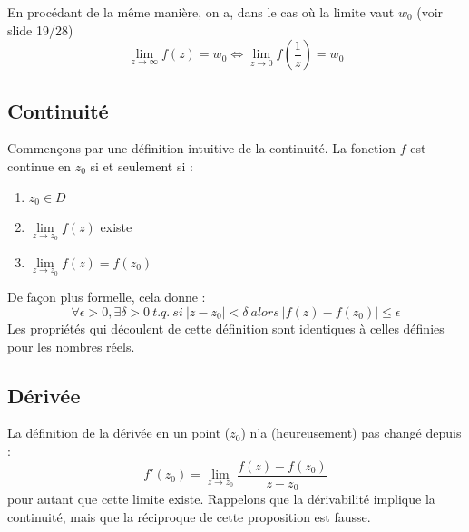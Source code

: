 En procédant de la même manière, on a, dans le cas où la limite
vaut $w_0$ (voir slide 19/28) 
\begin{equation}
	\lim \limits _{z \rightarrow \infty} f(z) = w_0 \Leftrightarrow \lim \limits _{z \rightarrow 0} f(\frac{1}{z}) = w_0 
\end{equation}

        
        
\subsection{Continuité}
Commençons par une définition intuitive de la continuité. La fonction $f$ est continue
en $z_0$ si et seulement si :
\begin{enumerate}
	\item $z_0 \in D$
	\item $\lim\limits_{z\rightarrow z_0} f(z)$ existe
	\item $\lim\limits_{z\rightarrow z_0} f(z) = f(z_0)$
\end{enumerate}
De façon plus formelle, cela donne :
\begin{equation}
	\forall \epsilon > 0, \exists \delta > 0\ t.q.\ si\ |z-z_0| < \delta\ alors\ |f(z) - f(z_0)|\leq \epsilon
\end{equation}
Les propriétés qui découlent de cette définition sont identiques à celles définies pour les
nombres réels.
    
    
\subsection{Dérivée}
La définition de la dérivée en un point ($z_0$) n'a (heureusement) pas changé depuis :
\begin{equation}
	f'(z_0) = \lim\limits_{z\rightarrow z_0} \frac{f(z)-f(z_0)}{z-z_0}
\end{equation}
pour autant que cette limite existe. Rappelons que la dérivabilité implique la continuité,
mais que la réciproque de cette proposition est fausse.\\
    
    
